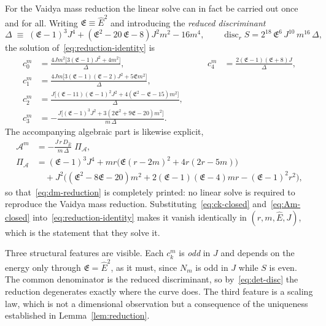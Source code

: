 \documentclass[12pt]{iopart}
\newcommand{\Ehat}{\hat E}
\theoremstyle{plain}
\theoremstyle{definition}
\theoremstyle{plain}
\theoremstyle{remark}
\begin{document}
For the Vaidya mass reduction the linear solve can in fact be carried out once and for
all. Writing $\mathfrak E\equiv\Ehat^{2}$ and introducing the \emph{reduced discriminant}
\begin{equation}
   \Delta\;\equiv\;(\mathfrak E-1)^3J^4+(\mathfrak E^2-20\,\mathfrak E-8)J^2m^2-16m^4,
   \qquad
   \operatorname{disc}_rS=2^{18}\,\mathfrak E^{6}\,J^{10}\,m^{16}\,\Delta,
   \label{eq:reduced-disc}
\end{equation}
the solution of~\eqref{eq:reduction-identity} is
\begin{equation}
\begin{aligned}
   c_0^m&=\frac{4Jm^2\big[3(\mathfrak E-1)J^2+4m^2\big]}{\Delta},&\qquad
   c_4^m&=\frac{2(\mathfrak E-1)(\mathfrak E+8)J}{\Delta},\\[2pt]
   c_1^m&=\frac{4Jm\big[3(\mathfrak E-1)(\mathfrak E-2)J^2+5\mathfrak Em^2\big]}{\Delta},\\[2pt]
   c_2^m&=\frac{J\big[(\mathfrak E-11)(\mathfrak E-1)^2J^2
     +4(\mathfrak E^2-\mathfrak E-15)m^2\big]}{\Delta},\\[2pt]
   c_3^m&=-\frac{J\big[(\mathfrak E-1)^3J^2
     +3(2\mathfrak E^2+9\mathfrak E-20)m^2\big]}{m\,\Delta}.
\end{aligned}
   \label{eq:ck-closed}
\end{equation}
The accompanying algebraic part is likewise explicit,
\begin{equation}
\begin{aligned}
   \mathcal{A}^m&=-\frac{J\,r\,D_{\Ehat}}{m\,\Delta}\;\Pi_{\mathcal A},\\
   \Pi_{\mathcal A}&=(\mathfrak E-1)^3J^4
     +mr\big(\mathfrak E(r-2m)^2+4r(2r-5m)\big)\\
   &\quad+J^2\big((\mathfrak E^2-8\mathfrak E-20)m^2
     +2(\mathfrak E-1)(\mathfrak E-4)mr-(\mathfrak E-1)^2r^2\big),
\end{aligned}
   \label{eq:Am-closed}
\end{equation}
so that~\eqref{eq:dm-reduction} is completely printed: no linear solve is required to
reproduce the Vaidya mass reduction. Substituting~\eqref{eq:ck-closed}
and~\eqref{eq:Am-closed} into~\eqref{eq:reduction-identity} makes it vanish identically in
$(r,m,\Ehat,J)$, which is the statement that they solve it.

Three structural features are visible. Each $c_k^m$ is \emph{odd} in $J$ and depends on the
energy only through $\mathfrak E=\Ehat^2$, as it must, since $N_m$ is odd in $J$ while $S$
is even. The common denominator is the reduced discriminant, so
by~\eqref{eq:det-disc} the reduction degenerates exactly where the curve does. The third
feature is a scaling law, which is not a dimensional observation but a consequence of the
uniqueness established in Lemma~\ref{lem:reduction}.
\end{document}
